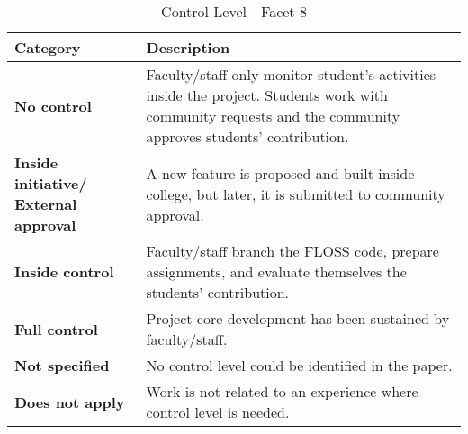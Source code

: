 \begin{table}[h]
	\centering
	\caption {Control Level - Facet 8}
   \vspace{-0.25cm}
        \begin{small}
		{\begin{tabular}{p{0.9in}|p{2.2in}}
			\bf Category & \bf Description \\
			\hline
			\bf No control & Faculty/staff only monitor student's activities inside the project. Students work with community requests and the community approves students' contribution.  \\ %
			\bf Inside initiative/ External approval & A new feature is proposed and built inside college, but later, it is submitted to community approval.\\
			\bf Inside control & Faculty/staff branch the FLOSS code, prepare assignments, and evaluate themselves the students' contribution. \\
			\bf Full control & Project core development has been sustained by faculty/staff. \\ %
			\bf Not specified & No control level could be identified in the paper. \\
			\bf Does not apply & Work is not related to an experience where control level is needed. \\
		\end{tabular}} \label{tab:controlLevel}
   \end{small}
\end{table}

